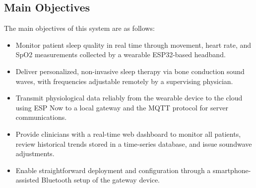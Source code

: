 \subsection{Main Objectives}

The main objectives of this system are as follows:
\begin{itemize}
    \item Monitor patient sleep quality in real time through movement, heart rate, and SpO2
          measurements collected by a wearable ESP32-based headband.
    \item Deliver personalized, non-invasive sleep therapy via bone conduction sound waves,
          with frequencies adjustable remotely by a supervising physician.
    \item Transmit physiological data reliably from the wearable device to the cloud using
          ESP Now to a local gateway and the MQTT protocol for server communications.
    \item Provide clinicians with a real-time web dashboard to monitor all patients, review
          historical trends stored in a time-series database, and issue soundwave adjustments.
    \item Enable straightforward deployment and configuration through a smartphone-assisted
          Bluetooth setup of the gateway device.
\end{itemize}